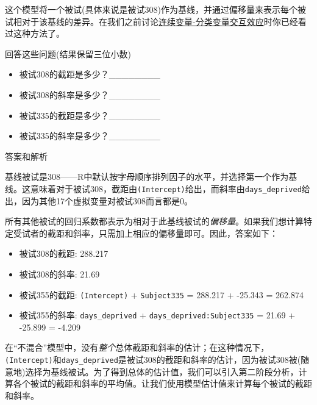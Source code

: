 \documentclass[
]{book}
\providecommand{\tightlist}{%
  \setlength{\itemsep}{0pt}\setlength{\parskip}{0pt}}
\begin{document}
这个模型将一个被试(具体来说是被试308)作为基线，并通过偏移量来表示每个被试相对于该基线的差异。在我们之前讨论\protect\hyperlink{cont-by-cat}{连续变量-分类变量交互效应}时你已经看过这种方法了。

回答这些问题(结果保留三位小数)

\begin{itemize}
\tightlist
\item
  被试308的截距是多少？\_\_\_\_\_\_\_\_
\item
  被试308的斜率是多少？\_\_\_\_\_\_\_\_
\item
  被试335的截距是多少？\_\_\_\_\_\_\_\_
\item
  被试335的斜率是多少？\_\_\_\_\_\_\_\_
\end{itemize}

答案和解析

基线被试是308------R中默认按字母顺序排列因子的水平，并选择第一个作为基线。这意味着对于被试308，截距由\texttt{(Intercept)}给出，而斜率由\texttt{days\_deprived}给出，因为其他17个虚拟变量对被试308而言都是0。

所有其他被试的回归系数都表示为相对于此基线被试的\emph{偏移量}。如果我们想计算特定受试者的截距和斜率，只需加上相应的偏移量即可。因此，答案如下：

\begin{itemize}
\item
  被试308的截距: 288.217
\item
  被试308的斜率: 21.69
\item
  被试355的截距: \texttt{(Intercept)} + \texttt{Subject335} = 288.217 + -25.343 = 262.874
\item
  被试355的斜率: \texttt{days\_deprived} + \texttt{days\_deprived:Subject335} = 21.69 + -25.899 = -4.209
\end{itemize}

在``不混合''模型中，没有\emph{整个}总体截距和斜率的估计；在这种情况下，\texttt{(Intercept)}和\texttt{days\_deprived}是被试308的截距和斜率的估计，因为被试308被(随意地)选择为基线被试。为了得到总体的估计值，我们可以引入第二阶段分析，计算各个被试的截距和斜率的平均值。让我们使用模型估计值来计算每个被试的截距和斜率。
\end{document}
